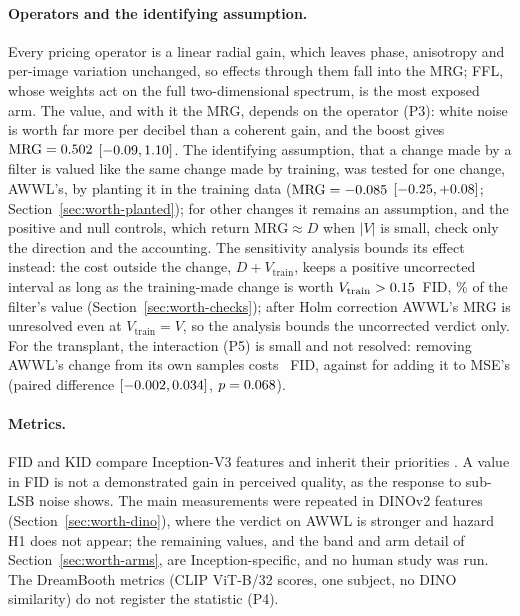 \paragraph{Operators and the identifying assumption.}
Every pricing operator is a linear radial gain, which leaves phase, anisotropy
and per-image variation unchanged, so effects through them fall into the MRG;
FFL, whose weights act on the full two-dimensional spectrum, is the most
exposed arm. The value, and with it the MRG, depends on the operator (P3): white
noise is worth far more per decibel than a coherent gain, and the boost gives
$\mathrm{MRG} = 0.502$ $[-0.09, 1.10]$. The identifying
assumption, that a change made by a filter is valued like the same change made
by training, was tested for one change, AWWL's, by planting it in the training
data ($\mathrm{MRG} = -0.085$ $[-0.25, +0.08]$;
Section~\ref{sec:worth-planted}); for other changes it remains an assumption,
and the positive and null controls, which return
$\mathrm{MRG} \approx D$ when $|V|$ is small, check only the direction and the
accounting. The sensitivity analysis bounds its effect instead: the cost
outside the change, $D + V_{\mathrm{train}}$, keeps a positive uncorrected
interval as long as the training-made change is worth
$V_{\mathrm{train}} > 0.15$~FID, \tipShare\% of the filter's value
(Section~\ref{sec:worth-checks}); after Holm correction AWWL's MRG is
unresolved even at $V_{\mathrm{train}} = V$, so the analysis bounds the
uncorrected verdict only. For the
transplant, the interaction (P5) is small and not resolved: removing AWWL's
change from its own samples costs \priceReverseValue~FID, against
\priceTransplantValue{} for adding it to MSE's (paired difference \interactionTransplant{}
$[-0.002, 0.034]$,
$p = 0.068$).

\paragraph{Metrics.}
FID and KID compare Inception-V3 features and inherit their priorities
\citep{kynkaanniemi2023role,stein2023exposing,jayasumana2024rethinking}. A
value in FID is not a demonstrated gain in perceived quality, as the response
to sub-LSB noise shows. The main measurements were repeated in DINOv2
features (Section~\ref{sec:worth-dino}), where the verdict on AWWL is stronger
and hazard H1 does not appear; the remaining values, and the band and arm
detail of Section~\ref{sec:worth-arms}, are Inception-specific, and no human
study was run. The DreamBooth metrics (CLIP
ViT-B/32 scores, one subject, no DINO similarity) do not register the
statistic (P4).

